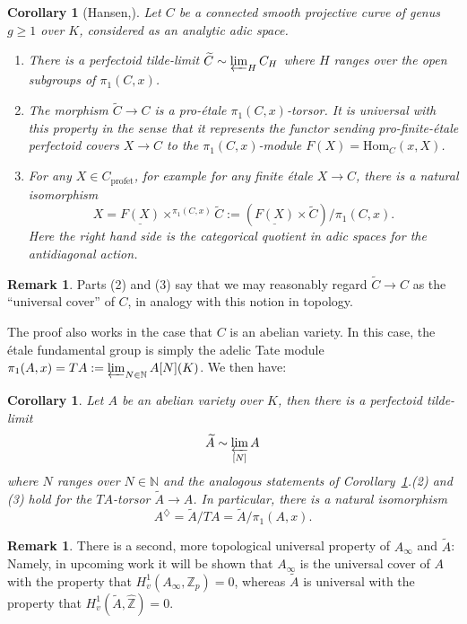 \documentclass[10pt,oneside]{amsart}
\newtheorem{corollary}[theorem]{Corollary}
\theoremstyle{definition}
\newtheorem{remark}[theorem]{Remark}
\newcommand{\N}{\mathbb{N}}
\newcommand{\Z}{\mathbb{Z}}
\begin{document}
	\begin{corollary}[Hansen,\cite{Hansen-blog}]\label{c:universal-covers-of-curves}
		Let $C$ be a connected smooth projective curve of genus $g\geq 1$ over $K$, considered as an analytic adic space.
		\begin{enumerate}
		\item There is a perfectoid tilde-limit $\widetilde{C} \sim \varprojlim_{H}C_H$ where $H$ ranges over the open subgroups of $ \pi_1(C,x)$. 
		\item The morphism $\widetilde{C}\to C$ is a pro-\'etale $\pi_1(C,x)$-torsor. It is universal with this property in the sense that it represents the functor sending	 pro-finite-\'etale perfectoid covers $X\to C$ to the $\pi_1(C,x)$-module $F(X)=\mathrm{Hom}_C(x,X)$.
		\item For any $X\in C_{\mathrm{prof\acute{e}t}}$, for example for any finite \'etale $X\to C$, there is a natural isomorphism
		\[ X = \underline{F(X)}\times^{\pi_1(C,x)}\widetilde{C}:=(\underline{F(X)}\times \widetilde{C})/\pi_1(C,x).\]
		Here the right hand side is the categorical quotient in adic spaces for the antidiagonal action.
	\end{enumerate}
	\end{corollary}
\begin{remark}
Parts (2) and (3) say that we may reasonably regard $\widetilde{C}\to C$ as the ``universal cover'' of $C$, in analogy with this notion in topology.
\end{remark}
The proof also works in the case that $C$ is an abelian variety. In this case, the \'etale fundamental group is simply the adelic Tate module  $\pi_1(A,x)=TA:=\varprojlim_{N\in \N} A[N](K)$. We then have:
\begin{corollary}\label{c:universal-covers-of-abelian-varieties}
	Let $A$ be an abelian variety over $K$, then there is a perfectoid tilde-limit \[\widetilde{A}\sim \varprojlim_{[N]}A\]
	where $N$ ranges over $N\in \N$
	and the analogous statements of Corollary~\ref{c:universal-covers-of-curves}.(2) and (3) hold for the $TA$-torsor $\widetilde{A}\to A$. In particular, there is a natural isomorphism
	\[A^{\diamondsuit}=\widetilde{A}/TA =\widetilde{A}/\pi_1(A,x).\]
\end{corollary}
\begin{remark}There is a second, more topological universal property of $A_\infty$ and $\widetilde{A}$: Namely, in upcoming work it will be shown that $A_\infty$ is the universal cover of $A$ with the property that $H^1_v(A_\infty,\Z_p)=0$, whereas $\widetilde{A}$ is universal with the property that $H^1_v(\widetilde{A},\widehat{\Z})=0$.
\end{remark}
\end{document}
